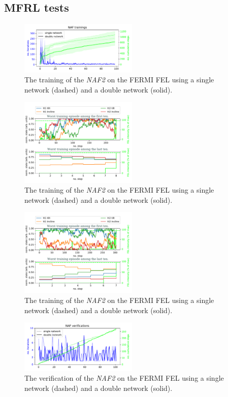 \documentclass[
reprint,
amsmath,amssymb,amsfonts,clevref,
aps,
prstab,
]{revtex4-2}
\begin{document}
	\subsection{MFRL tests}
	\begin{figure}
		\centering
		\includegraphics*[width=0.5\textwidth]{Figures/FERMI_all_experiments_NAF_training_episodes.pdf}
		\caption{The training of the \emph{NAF2} on the FERMI FEL using a single network (dashed) and a double network (solid).}
		\label{fig:NAF_training}
	\end{figure}
	\begin{figure}
		\centering
		\includegraphics*[width=0.5\textwidth]{Figures/Evolution_double.pdf}
		\caption{The training of the \emph{NAF2} on the FERMI FEL using a single network (dashed) and a double network (solid).}
		\label{fig:NAF_evolution_double}
	\end{figure}
	\begin{figure}
	\centering
	\includegraphics*[width=0.5\textwidth]{Figures/Evolution_single.pdf}
	\caption{The training of the \emph{NAF2} on the FERMI FEL using a single network (dashed) and a double network (solid).}
	\label{fig:NAF_evolution_single}
\end{figure}
	\begin{figure}
		\centering
		\includegraphics*[width=0.5\textwidth]{Figures/FERMI_all_experiments_NAF_verification_episodes.pdf}
		\caption{The verification of the \emph{NAF2} on the FERMI FEL using a single network (dashed) and a double network (solid).}
		\label{fig:NAF_verification}
	\end{figure}
	
\end{document}
